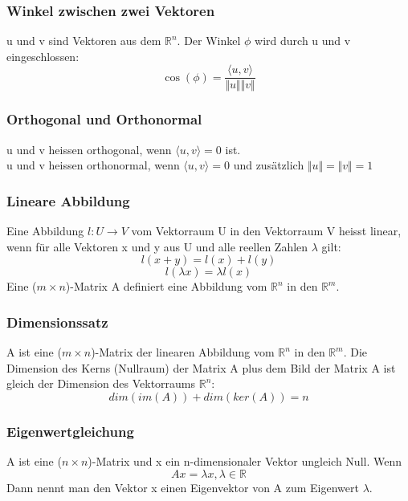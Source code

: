 \documentclass[10pt]{scrartcl}
\begin{document}
\begin{multicols}{2}
\subsubsection*{Winkel zwischen zwei Vektoren}
u und v sind Vektoren aus dem $\mathbb{R}^n$. Der Winkel $\phi$ wird durch u und v eingeschlossen:
\begin{equation}
\cos (\phi) = \dfrac{\langle u,v \rangle}{\Vert u\Vert \Vert v \Vert}
\end{equation}
\subsubsection*{Orthogonal und Orthonormal}
u und v heissen orthogonal, wenn $\langle u,v \rangle = 0$ ist. \\
u und v heissen orthonormal, wenn $\langle u,v \rangle = 0$ und zusätzlich $\Vert u \Vert = \Vert v \Vert = 1$
\subsubsection*{Lineare Abbildung}
Eine Abbildung $l : U \rightarrow V$ vom Vektorraum U in den Vektorraum V heisst linear, wenn für alle Vektoren x und y aus U und alle reellen Zahlen $\lambda$ gilt:
\begin{equation}
l(x+y) = l(x) + l(y)
\end{equation}
\[l(\lambda x) = \lambda l (x)\]
Eine ($m \times n$)-Matrix A definiert eine Abbildung vom $\mathbb{R}^n$ in den $\mathbb{R}^m$.
\subsubsection*{Dimensionssatz}
A ist eine ($m \times n$)-Matrix der linearen Abbildung vom $\mathbb{R}^n$ in den $\mathbb{R}^m$. Die Dimension des Kerns (Nullraum) der Matrix A plus dem Bild der Matrix A ist gleich der Dimension des Vektorraums $\mathbb{R}^n$:
\begin{equation}
dim(im(A)) + dim(ker(A)) = n
\end{equation}
\subsubsection*{Eigenwertgleichung}
A ist eine ($n \times n$)-Matrix und x ein n-dimensionaler Vektor ungleich Null. Wenn
\begin{equation}
Ax = \lambda x , \lambda \in \mathbb{R}
\end{equation}
Dann nennt man den Vektor x einen Eigenvektor von A zum Eigenwert $\lambda$.

\end{multicols}
\end{document}
